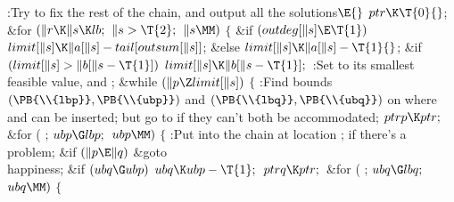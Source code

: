 \B{}:Try to fix the rest of the chain, and output all
the solutions\X${}\E{}$\6
$\\{ptr}\K\T{0}{}$;\6
\&{for} ${}(\|r\K\|s\K\\{lb};{}$ ${}\|s>\T{2};{}$ ${}\|s\MM){}$\5
${}\{{}$\1\6
\&{if} ${}(\\{outdeg}[\|s]\E\T{1}){}$\1\5
${}\\{limit}[\|s]\K\|a[\|s]-\\{tail}[\\{outsum}[\|s]]{}$;\5
\2\&{else}\1\5
${}\\{limit}[\|s]\K\|a[\|s]-\T{1}{}$;\2\6
\&{if} ${}(\\{limit}[\|s]>\|b[\|s-\T{1}]){}$\1\5
${}\\{limit}[\|s]\K\|b[\|s-\T{1}];{}$\2\6
:Set  to its smallest feasible value, and %
\X;\6
\&{while} ${}(\|p\Z\\{limit}[\|s]){}$\5
${}\{{}$\1\6
:Find bounds $(\PB{\\{lbp}},\PB{\\{ubp}})$ and $(\PB{\\{lbq}},\PB{%
\\{ubq}})$ on where  and  can be inserted; but go to  if they can't both be accommodated\X;\6
${}\\{ptrp}\K\\{ptr};{}$\6
\&{for} ( ; ${}\\{ubp}\G\\{lbp};{}$ ${}\\{ubp}\MM){}$\5
${}\{{}$\1\6
:Put  into the chain at location ;  if there's a problem\X;\6
\&{if} ${}(\|p\E\|q){}$\1\5
\&{goto} \\{happiness};\2\6
\&{if} ${}(\\{ubq}\G\\{ubp}){}$\1\5
${}\\{ubq}\K\\{ubp}-\T{1};{}$\2\6
${}\\{ptrq}\K\\{ptr};{}$\6
\&{for} ( ; ${}\\{ubq}\G\\{lbq};{}$ ${}\\{ubq}\MM){}$\5
${}\{{}$\1\6
